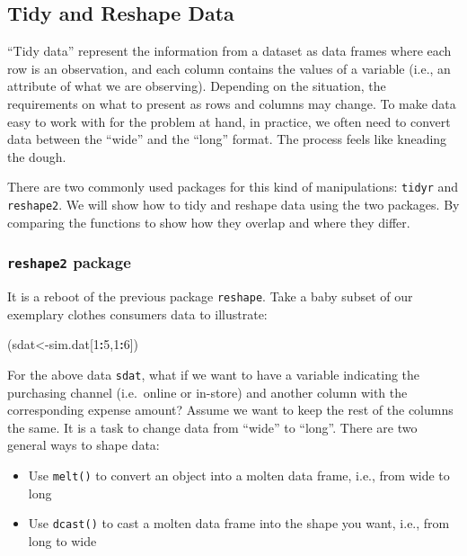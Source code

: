 \documentclass[12pt,]{krantz}
\makeatletter
\newenvironment{Shaded}{\begin{snugshade}}{\end{snugshade}}
\newcommand{\DecValTok}[1]{\textcolor[rgb]{0.06,0.06,0.06}{#1}}
\newcommand{\OperatorTok}[1]{\textcolor[rgb]{0.43,0.43,0.43}{\textbf{#1}}}
\newcommand{\NormalTok}[1]{#1}
\providecommand{\tightlist}{%
  \setlength{\itemsep}{0pt}\setlength{\parskip}{0pt}}
\newenvironment{kframe}{%
\medskip{}
\setlength{\fboxsep}{.8em}
 \def\at@end@of@kframe{}%
 \ifinner\ifhmode%
  \def\at@end@of@kframe{\end{minipage}}%
  \begin{minipage}{\columnwidth}%
 \fi\fi%
 \def\FrameCommand##1{\hskip\@totalleftmargin \hskip-\fboxsep
 \colorbox{shadecolor}{##1}\hskip-\fboxsep
     \hskip-\linewidth \hskip-\@totalleftmargin \hskip\columnwidth}%
 \MakeFramed {\advance\hsize-\width
   \@totalleftmargin\z@ \linewidth\hsize
   \@setminipage}}%
 {\par\unskip\endMakeFramed%
 \at@end@of@kframe}
\renewenvironment{Shaded}{\begin{kframe}}{\end{kframe}}
\theoremstyle{definition}
\theoremstyle{definition}
\theoremstyle{definition}
\theoremstyle{remark}
\makeatother
\begin{document}
\subsection{Tidy and Reshape Data}\label{tidy-and-reshape-data}

``Tidy data'' represent the information from a dataset as data frames
where each row is an observation, and each column contains the values of
a variable (i.e., an attribute of what we are observing). Depending on
the situation, the requirements on what to present as rows and columns
may change. To make data easy to work with for the problem at hand, in
practice, we often need to convert data between the ``wide'' and the
``long'' format. The process feels like kneading the dough.

There are two commonly used packages for this kind of manipulations:
\texttt{tidyr} and \texttt{reshape2}. We will show how to tidy and
reshape data using the two packages. By comparing the functions to show
how they overlap and where they differ.

\subsubsection{\texorpdfstring{\texttt{reshape2}
package}{reshape2 package}}\label{reshape2-package}

It is a reboot of the previous package \texttt{reshape}. Take a baby
subset of our exemplary clothes consumers data to illustrate:

\begin{Shaded}
\begin{Highlighting}[]
\NormalTok{(sdat<-sim.dat[}\DecValTok{1}\OperatorTok{:}\DecValTok{5}\NormalTok{,}\DecValTok{1}\OperatorTok{:}\DecValTok{6}\NormalTok{])}
\end{Highlighting}
\end{Shaded}

For the above data \texttt{sdat}, what if we want to have a variable
indicating the purchasing channel (i.e.~online or in-store) and another
column with the corresponding expense amount? Assume we want to keep the
rest of the columns the same. It is a task to change data from ``wide''
to ``long''. There are two general ways to shape data:

\begin{itemize}
\tightlist
\item
  Use \texttt{melt()} to convert an object into a molten data frame,
  i.e., from wide to long
\item
  Use \texttt{dcast()} to cast a molten data frame into the shape you
  want, i.e., from long to wide
\end{itemize}
\end{document}
